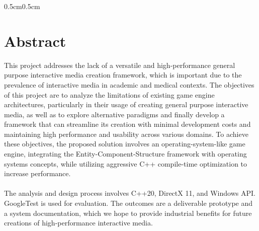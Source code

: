 \begin{adjustwidth}{0.5cm}{0.5cm}
    \section*{\normalsize Abstract}
    \vspace{-0.3cm}
    \normalsize
    This project addresses the lack of a versatile and high-performance general purpose interactive media
    creation framework, which is important due to the prevalence of interactive media in academic and medical contexts.
    The objectives of this project are to analyze the limitations of existing game engine architectures, particularly
    in their usage of creating general purpose interactive media, as well as to explore alternative paradigms and
    finally develop a framework that can streamline its creation with minimal development costs and maintaining high
    performance and usability across various domains.
    To achieve these objectives, the proposed solution involves an operating-system-like game engine, integrating
    the Entity-Component-Structure framework with operating systems concepts, while utilizing aggressive C++ compile-time
    optimization to increase performance.
    \\\\
    The analysis and design process involves C++20, DirectX 11, and Windows API. GoogleTest is used for evaluation.
    The outcomes are a deliverable prototype and a system documentation,
    which we hope to provide industrial benefits for future creations of high-performance interactive media.

\end{adjustwidth}